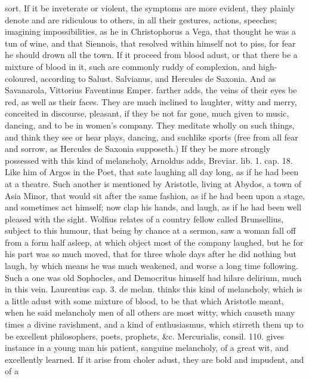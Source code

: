 {sort. If it be inveterate or violent, the symptoms are more evident,
they plainly denote and are ridiculous to others, in all their
gestures, actions, speeches; imagining impossibilities, as he in
Christophorus a Vega, that thought he was a tun of wine, and that
Siennois, that resolved within himself not to piss, for fear he should
drown all the town.
If it proceed from blood adust, or that there be a mixture of blood in
it, such are commonly ruddy of complexion, and high-coloured,
according to Salust. Salvianus, and Hercules de Saxonia. And as
Savanarola, Vittorius Faventinus Emper. farther adds, the veins
of their eyes be red, as well as their faces. They are much inclined to
laughter, witty and merry, conceited in discourse, pleasant, if they be
not far gone, much given to music, dancing, and to be in women's
company. They meditate wholly on such things, and think they see
or hear plays, dancing, and suchlike sports (free from all fear and
sorrow, as Hercules de Saxonia supposeth.) If they be more
strongly possessed with this kind of melancholy, Arnoldus adds,
Breviar. lib. 1. cap. 18. Like him of Argos in the Poet, that sate
laughing all day long, as if he had been at a theatre. Such
another is mentioned by Aristotle, living at Abydos, a town of
Asia Minor, that would sit after the same fashion, as if he had been
upon a stage, and sometimes act himself; now clap his hands, and laugh,
as if he had been well pleased with the sight. Wolfius relates of a
country fellow called Brunsellius, subject to this humour, that
being by chance at a sermon, saw a woman fall off from a form half
asleep, at which object most of the company laughed, but he for his
part was so much moved, that for three whole days after he did nothing
but laugh, by which means he was much weakened, and worse a long time
following. Such a one was old Sophocles, and Democritus himself had
hilare delirium, much in this vein. Laurentius cap. 3. de melan. thinks
this kind of melancholy, which is a little adust with some mixture of
blood, to be that which Aristotle meant, when he said melancholy men of
all others are most witty, which causeth many times a divine
ravishment, and a kind of enthusiasmus, which stirreth them up to be
excellent philosophers, poets, prophets, \&c. Mercurialis, consil. 110.
gives instance in a young man his patient, sanguine melancholy,
of a great wit, and excellently learned.
If it arise from choler adust, they are bold and impudent, and of a
}
